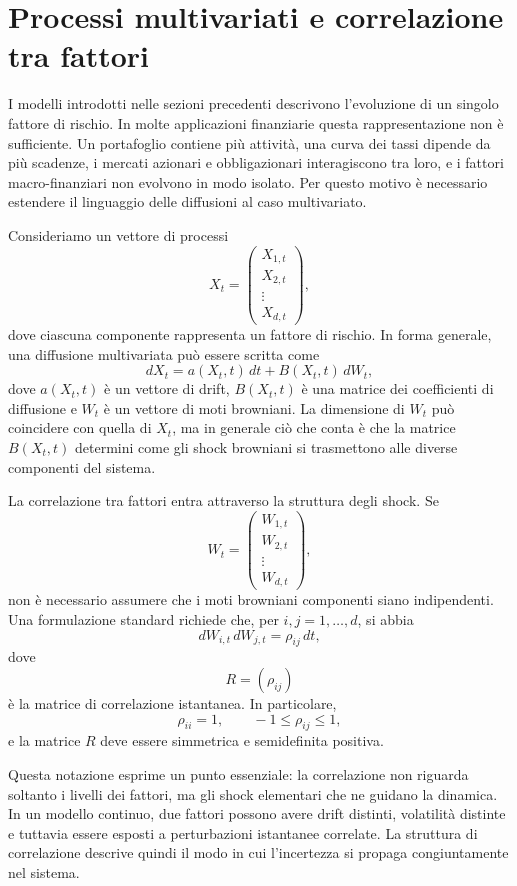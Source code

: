 \section{Processi multivariati e correlazione tra fattori}

I modelli introdotti nelle sezioni precedenti descrivono l'evoluzione di
un singolo fattore di rischio. In molte applicazioni finanziarie questa
rappresentazione non \`{e} sufficiente. Un portafoglio contiene pi\`{u}
attivit\`{a}, una curva dei tassi dipende da pi\`{u} scadenze, i mercati
azionari e obbligazionari interagiscono tra loro, e i fattori
macro-finanziari non evolvono in modo isolato. Per questo motivo \`{e}
necessario estendere il linguaggio delle diffusioni al caso
multivariato.

Consideriamo un vettore di processi
\[
X_t=
\begin{pmatrix}
X_{1,t}\\
X_{2,t}\\
\vdots\\
X_{d,t}
\end{pmatrix},
\]
dove ciascuna componente rappresenta un fattore di rischio. In forma
generale, una diffusione multivariata pu\`{o} essere scritta come
\[
dX_t=a(X_t,t)\,dt+B(X_t,t)\,dW_t,
\]
dove $a(X_t,t)$ \`{e} un vettore di drift, $B(X_t,t)$ \`{e} una matrice
dei coefficienti di diffusione e $W_t$ \`{e} un vettore di moti
browniani. La dimensione di $W_t$ pu\`{o} coincidere con quella di
$X_t$, ma in generale ci\`{o} che conta \`{e} che la matrice
$B(X_t,t)$ determini come gli shock browniani si trasmettono alle
diverse componenti del sistema.

La correlazione tra fattori entra attraverso la struttura degli shock. Se
\[
W_t=
\begin{pmatrix}
W_{1,t}\\
W_{2,t}\\
\vdots\\
W_{d,t}
\end{pmatrix},
\]
non \`{e} necessario assumere che i moti browniani componenti siano
indipendenti. Una formulazione standard richiede che, per
$i,j=1,\ldots,d$, si abbia
\[
dW_{i,t}\,dW_{j,t}=\rho_{ij}\,dt,
\]
dove
\[
R=(\rho_{ij})
\]
\`{e} la matrice di correlazione istantanea. In particolare,
\[
\rho_{ii}=1,
\qquad
-1\leq \rho_{ij}\leq 1,
\]
e la matrice $R$ deve essere simmetrica e semidefinita positiva.

Questa notazione esprime un punto essenziale: la correlazione non riguarda
soltanto i livelli dei fattori, ma gli shock elementari che ne guidano la
dinamica. In un modello continuo, due fattori possono avere drift
distinti, volatilit\`{a} distinte e tuttavia essere esposti a
perturbazioni istantanee correlate. La struttura di correlazione descrive
quindi il modo in cui l'incertezza si propaga congiuntamente nel sistema.


